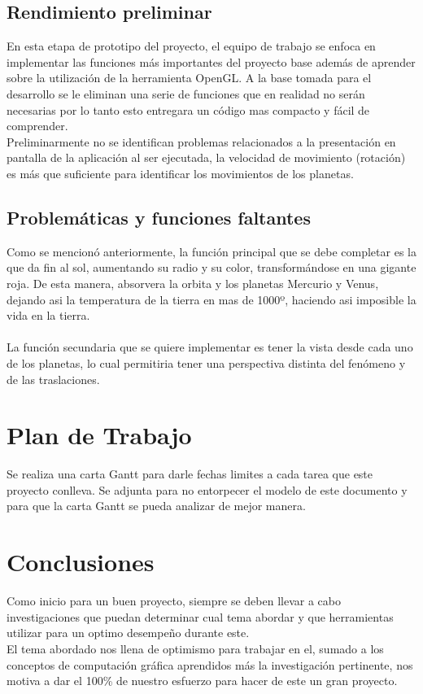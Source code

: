 \documentclass[12pt,journal,compsoc]{IEEEtran}
\begin{document}
\subsection{Rendimiento preliminar}
En esta etapa de prototipo del proyecto, el equipo de trabajo se enfoca en implementar las funciones más importantes del proyecto base además de aprender sobre la utilización de la herramienta OpenGL. A la base tomada para el desarrollo se le eliminan una serie de funciones que en realidad no serán necesarias por lo tanto esto entregara un código mas compacto y fácil de comprender.\\
Preliminarmente no se identifican problemas relacionados a la presentación en pantalla de la aplicación al ser ejecutada, la velocidad de movimiento (rotación) es más que suficiente para identificar los movimientos de los planetas.\\
\subsection{Problemáticas y funciones faltantes}
%
Como se mencionó anteriormente, la función principal que se debe completar es la que da fin al sol, aumentando su radio y su color, transformándose en una gigante roja\cite{far}. De esta manera, absorvera la orbita y los planetas Mercurio y Venus, dejando asi la temperatura de la tierra en mas de 1000º, haciendo asi imposible la vida en la tierra.\\
\\
La función secundaria que se quiere implementar es tener la vista desde cada uno de los planetas, lo cual permitiria tener una perspectiva distinta del fenómeno y de las traslaciones.
\section{Plan de Trabajo}
Se realiza una carta Gantt para darle fechas limites a cada tarea que este proyecto conlleva. Se adjunta para no entorpecer el modelo de este documento y para que la carta Gantt se pueda analizar de mejor manera.
%
%
\section{Conclusiones}
%
Como inicio para un buen proyecto, siempre se deben llevar a cabo investigaciones que puedan determinar cual tema abordar y que herramientas utilizar para un optimo desempeño durante este.\\
El tema abordado nos llena de optimismo para trabajar en el, sumado a los conceptos de computación gráfica aprendidos más la investigación pertinente, nos motiva a dar el 100\% de nuestro esfuerzo para hacer de este un gran proyecto.
%


\end{document}
